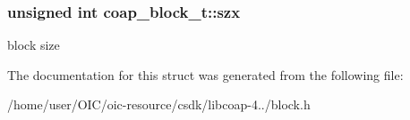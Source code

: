 \subsubsection[{szx}]{\setlength{\rightskip}{0pt plus 5cm}unsigned int coap\+\_\+block\+\_\+t\+::szx}\label{structcoap__block__t_aaeb4409b7a94cc0de61ea7657996d329}
block size 

The documentation for this struct was generated from the following file\+:\begin{DoxyCompactItemize}
\item 
/home/user/\+O\+I\+C/oic-\/resource/csdk/libcoap-\/4../block.\+h\end{DoxyCompactItemize}
